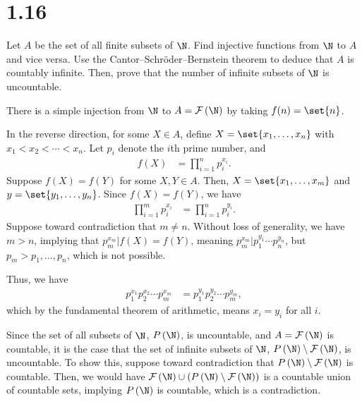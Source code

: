 \documentclass[12pt]{mypackage}
\begin{document}
\section{1.16}%
\begin{problem}
  Let $A$ be the set of all finite subsets of $\N$. Find injective functions from $\N$ to $A$ and vice versa. Use the Cantor--Schröder--Bernstein theorem to deduce that $A$ is countably infinite. Then, prove that the number of infinite subsets of $\N$ is uncountable.
\end{problem}
\begin{solution}
  There is a simple injection from $\N$ to $A = \mathcal{F}\left(\N\right)$ by taking $f(n) = \set{n}$.\newline

  In the reverse direction, for some $X\in A$, define $X = \set{x_1,\dots,x_n}$ with $x_1 < x_2 < \cdots < x_n $. Let $p_i$ denote the $i$th prime number, and
  \begin{align*}
    f(X) &= \prod_{i=1}^{n}p_i^{x_i}.
  \end{align*}
  Suppose $f(X) = f(Y)$ for some $X,Y\in A$. Then, $X = \set{x_1,\dots,x_m}$ and $y = \set{y_1,\dots,y_n}$. Since $f(X) = f(Y)$, we have
  \begin{align*}
    \prod_{i=1}^{m}p_i^{x_i} &= \prod_{i=1}^{n} p_i^{y_i}.
  \end{align*}
  Suppose toward contradiction that $m\neq n$. Without loss of generality, we have $m > n$, implying that $p_m^{x_m}|f(X) = f(Y)$, meaning $p_m^{x_m}|p_1^{y_1}\cdots p_n^{y_n}$, but $p_m > p_1,\dots,p_n$, which is not possible.\newline

  Thus, we have
  \begin{align*}
    p_1^{x_1}p_2^{x_2}\cdots p_m^{x_m} &= p_1^{y_1}p_2^{y_2}\cdots p_m^{y_m},
  \end{align*}
  which by the fundamental theorem of arithmetic, means $x_i = y_i$ for all $i$.\newline

  Since the set of all subsets of $\N$, $P\left(\N\right)$, is uncountable, and $A = \mathcal{F}\left(\N\right)$ is countable, it is the case that the set of infinite subsets of $\N$, $P\left(\N\right) \setminus \mathcal{F}\left(\N\right)$, is uncountable. To show this, suppose toward contradiction that $P\left(\N\right)\setminus \mathcal{F}\left(\N\right)$ is countable. Then, we would have $\mathcal{F}\left(\N\right)\cup \left(P\left(\N\right)\setminus \mathcal{F}\left(\N\right)\right)$ is a countable union of countable sets, implying $P\left(\N\right)$ is countable, which is a contradiction.
\end{solution}
\end{document}
